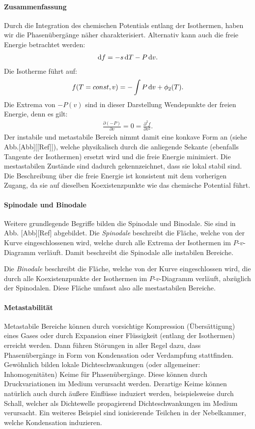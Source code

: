 \paragraph*{Zusammenfassung}
Durch die Integration des chemischen Potentials entlang der Isothermen, haben wir die Phasenübergänge näher charakterisiert. Alternativ kann auch die freie Energie betrachtet werden:
\begin{align*}
    \mathop{}\!\mathrm{d} f=-s\mathop{}\!\mathrm{d} T-P\mathop{}\!\mathrm{d} v.
\end{align*}
Die Isotherme führt auf:
\begin{align*}
    f(T=const,v)=-\int P\mathop{}\!\mathrm{d} v+\phi_2(T).
\end{align*}
Die Extrema von $-P(v)$ sind in dieser Darstellung Wendepunkte der freien Energie, denn es gilt:
\begin{align*}
    \frac{\partial(-P)}{\partial v}=0=\frac{\partial^2f}{\partial v^2}.
\end{align*}
Der instabile und metastabile Bereich nimmt damit eine konkave Form an (siehe Abb.[Abb][[Ref]]), welche physikalisch durch die anliegende Sekante (ebenfalls Tangente der Isothermen) ersetzt wird und die freie Energie minimiert. Die mestastabilen Zustände sind dadurch gekennzeichnet, dass sie lokal stabil sind. Die Beschreibung über die freie Energie ist konsistent mit dem vorherigen Zugang, da sie auf dieselben Koexistenzpunkte wie das chemische Potential führt.
\paragraph*{Spinodale und Binodale}
Weitere grundlegende Begriffe bilden die Spinodale und Binodale. 
Sie sind in Abb. [Abb][Ref] abgebildet. 
Die \emph{Spinodale} beschreibt die Fläche, welche von der Kurve eingeschlossenen wird, welche durch alle Extrema der Isothermen im $P$-$v$-Diagramm verläuft. Damit beschreibt die Spinodale alle instabilen Bereiche.

Die \emph{Binodale} beschreibt die Fläche, welche von der Kurve eingeschlossen wird, die durch alle Koexistenzpunkte der Isothermen im $P$-$v$-Diagramm verläuft, abzüglich der Spinodalen. Diese Fläche umfasst also alle mestastabilen Bereiche.

\paragraph*{Metastabilität}
Metastabile Bereiche können durch vorsichtige Kompression (Übersättigung) eines Gases oder durch Expansion einer Flüssigkeit (entlang der Isothermen) erreicht werden. Dann führen Störungen in aller Regel dazu, dass Phasenübergänge in Form von Kondensation oder Verdampfung stattfinden.
Gewöhnlich bilden lokale Dichteschwankungen (oder allgemeiner: Inhomogenitäten)  Keime für Phasenübergänge. Diese können durch Druckvariationen im Medium verursacht werden. Derartige Keime können natürlich auch durch äußere Einflüsse induziert werden, beispielsweise durch Schall, welcher als Dichtewelle propagierend Dichteschwankungen im Medium verursacht. Ein weiteres Beispiel sind ionisierende Teilchen in der Nebelkammer, welche Kondensation induzieren.

